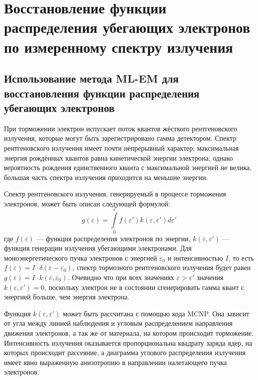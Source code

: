 
\FloatBarrier
\section{ Восстановление функции распределения убегающих электронов по измеренному спектру излучения }

\subsection{ Использование метода ML-EM для восстановления функции распределения убегающих электронов }
\label{sec:runawayReconstructionMlem}

При торможении электрон испускает поток квантов жёсткого рентгеновского излучения, которые могут быть зарегистрировано гамма детектором. Спектр рентгеновского излучения имеет почти непрерывный характер; максимальная энергия рождённых квантов равна кинетической энергии электрона, однако вероятность рождения единственного кванта с максимальной энергией не велика, большая часть спектра излучения приходится на меньшие энергии.~\cite{Kuznetsov1974}

Спектр рентгеновского излучения, генерируемый в процессе торможения электронов, может быть описан следующей формулой:
\begin{equation}
  \label{eq:RunawayConvolution}
  g( \varepsilon ) = \int \limits_0^{ \varepsilon } f(\varepsilon') k( \varepsilon, \varepsilon' ) d \varepsilon'
\end{equation}
где $f(\varepsilon)$ --- функция распределения электронов по энергии, $k( \varepsilon, \varepsilon' )$ --- функция генерации излучения убегающими электронами. Для моноэнергетического пучка электронов с энергией $\varepsilon_0$ и интенсивностью $I$, то есть $ f(\varepsilon) = I \cdot \delta( \varepsilon - \varepsilon_0 ) $, спектр тормозного рентгеновского излучения будет равен $g(\varepsilon) = I \cdot k( \varepsilon, \varepsilon_0 )$. Очевидно что при всех значениях $\varepsilon > \varepsilon'$ значения $k( \varepsilon, \varepsilon' ) = 0$, поскольку электрон не в состоянии сгенерировать гамма квант с энергией больше, чем энергия электрона.~\cite{Shevelev2013} 

Функция $k( \varepsilon, \varepsilon' )$ может быть рассчитана с помощью кода MCNP. Она зависит от угла между линией наблюдения и угловым распределением направления движения электронов, а так же от материала, на котором происходит торможение. Интенсивность излучения оказывается пропорциональна квадрату заряда ядер, на которых происходит рассеяние, а диаграмма углового распределения излучения имеет явно выраженную анизотропию в направлении налетающего пучка электронов.~\cite{Shevelev2013}


